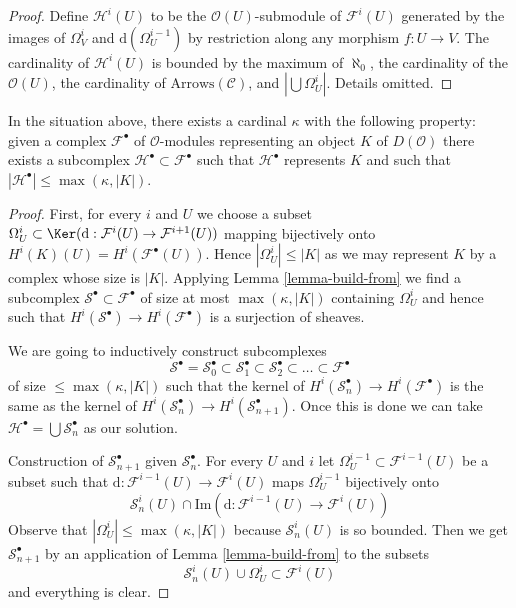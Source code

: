 \begin{proof}
Define $\mathcal{H}^i(U)$ to be the
$\mathcal{O}(U)$-submodule of $\mathcal{F}^i(U)$
generated by the images of $\Omega^i_V$ and $\text{d}(\Omega^{i - 1}_U)$
by restriction along any morphism $f : U \to V$.
The cardinality of $\mathcal{H}^i(U)$ is bounded
by the maximum of $\aleph_0$, the cardinality of the $\mathcal{O}(U)$,
the cardinality of $\text{Arrows}(\mathcal{C})$, and $|\bigcup \Omega^i_U|$.
Details omitted.
\end{proof}

\begin{lemma}
\label{lemma-qis-small}
In the situation above, there exists a cardinal $\kappa$ with the
following property: given a complex $\mathcal{F}^\bullet$ of
$\mathcal{O}$-modules representing an object $K$ of $D(\mathcal{O})$
there exists a subcomplex $\mathcal{H}^\bullet \subset \mathcal{F}^\bullet$
such that $\mathcal{H}^\bullet$ represents $K$ and such that
$|\mathcal{H}^\bullet| \leq \max(\kappa, |K|)$.
\end{lemma}

\begin{proof}
First, for every $i$ and $U$ we choose a subset
$\Omega^i_U \subset \Ker(\text{d} :
\mathcal{F}^i(U) \to \mathcal{F}^{i + 1}(U))$
mapping bijectively onto
$H^i(K)(U) = H^i(\mathcal{F}^\bullet(U))$.
Hence $|\Omega^i_U| \leq |K|$ as we may represent $K$ by
a complex whose size is $|K|$.
Applying Lemma \ref{lemma-build-from}
we find a subcomplex $\mathcal{S}^\bullet \subset \mathcal{F}^\bullet$
of size at most $\max(\kappa, |K|)$ containing $\Omega^i_U$
and hence such that $H^i(\mathcal{S}^\bullet) \to H^i(\mathcal{F}^\bullet)$
is a surjection of sheaves.

\medskip\noindent
We are going to inductively construct subcomplexes
$$
\mathcal{S}^\bullet =
\mathcal{S}_0^\bullet \subset
\mathcal{S}_1^\bullet \subset
\mathcal{S}_2^\bullet \subset \ldots \subset \mathcal{F}^\bullet
$$
of size $\leq \max(\kappa, |K|)$ such that
the kernel of $H^i(\mathcal{S}_n^\bullet) \to H^i(\mathcal{F}^\bullet)$
is the same as the kernel of
$H^i(\mathcal{S}_n^\bullet) \to H^i(\mathcal{S}_{n + 1}^\bullet)$.
Once this is done we can take
$\mathcal{H}^\bullet = \bigcup \mathcal{S}_n^\bullet$ as our solution.

\medskip\noindent
Construction of $\mathcal{S}_{n + 1}^\bullet$ given
$\mathcal{S}_n^\bullet$. For every $U$ and $i$ let
$\Omega^{i - 1}_U \subset \mathcal{F}^{i - 1}(U)$ be a subset
such that $\text{d} : \mathcal{F}^{i - 1}(U) \to \mathcal{F}^i(U)$
maps $\Omega^{i - 1}_U$ bijectively onto
$$
\mathcal{S}_n^i(U) \cap
\text{Im}(\text{d} : \mathcal{F}^{i - 1}(U)\to \mathcal{F}^i(U))
$$
Observe that $|\Omega^i_U| \leq \max(\kappa, |K|)$ because $\mathcal{S}_n^i(U)$
is so bounded. Then we get $\mathcal{S}_{n + 1}^\bullet$ by an
application of Lemma \ref{lemma-build-from} to the subsets
$$
\mathcal{S}_n^i(U) \cup \Omega^i_U \subset \mathcal{F}^i(U)
$$
and everything is clear.
\end{proof}


